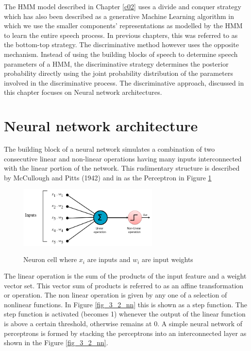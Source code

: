 The HMM model described in Chapter \ref{c02} uses a divide and conquer strategy which has also been described as a generative Machine Learning algorithm in which we use the smaller components’ representations as modelled by the HMM to learn the entire speech process.   In previous chapters, this was referred to as the bottom-top strategy.  The discriminative method however uses the opposite mechanism.  Instead of using the building blocks of speech to determine speech parameters of a HMM, the discriminative strategy determines the posterior probability directly using the joint probability distribution of the parameters involved in the discriminative process.  The discriminative approach, discussed in this chapter focuses on Neural network architectures.

\section{Neural network architecture}

The building block of a neural network simulates a combination of two consecutive linear and non-linear operations having many inputs interconnected with the linear portion of the network.  This rudimentary structure is described by McCullough and Pitts (1942) and in  \cite{cowan1990discussion} as the Perceptron in Figure \ref{fig_3_1_ptron} 

\begin{figure}
\centering
  \includegraphics[width=7cm]{thesis/images/ptron2.png}\\
  \caption{Neuron cell where $x_i$ are inputs and $w_i$ are input weights} \label{fig_3_1_ptron}
\end{figure}

The linear operation is the sum of the products of the input feature and a  weight vector set.  This vector sum of products is referred to as an affine transformation or operation.  The non linear operation is given by any one of a selection of nonlinear functions.  In  Figure \ref{fig_3_2_nn} this is shown as a step function.  The step function is activated (becomes 1) whenever the output of the linear function is above a certain threshold, otherwise remains at 0.  A simple neural network of perceptrons is formed by stacking the perceptrons into an interconnected layer as shown in the Figure \ref{fig_3_2_nn}.

